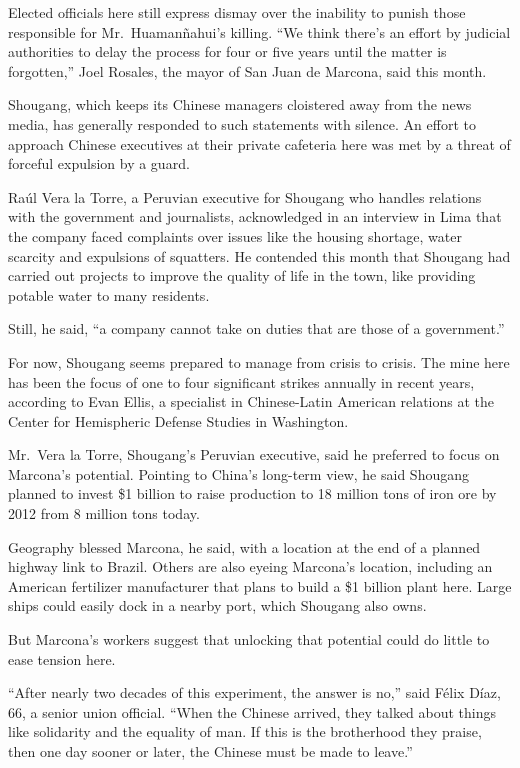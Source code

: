 ﻿\documentclass[12pt]{article}
\begin{document}
Elected officials here still express dismay over the inability to punish those responsible for
Mr.~Huaman\~{n}ahui's killing. ``We think there's an effort by judicial authorities to delay the
process for four or five years until the matter is forgotten,'' Joel Rosales, the mayor of San Juan
de Marcona, said this month.

Shougang, which keeps its Chinese managers cloistered away from the news media, has generally
responded to such statements with silence. An effort to approach Chinese executives at their private
cafeteria here was met by a threat of forceful expulsion by a guard.

Raúl Vera la Torre, a Peruvian executive for Shougang who handles relations with the government and
journalists, acknowledged in an interview in Lima that the company faced complaints over issues like
the housing shortage, water scarcity and expulsions of squatters. He contended this month that
Shougang had carried out projects to improve the quality of life in the town, like providing potable
water to many residents.

Still, he said, ``a company cannot take on duties that are those of a government.''

For now, Shougang seems prepared to manage from crisis to crisis. The mine here has been the focus
of one to four significant strikes annually in recent years, according to Evan Ellis, a specialist
in Chinese-Latin American relations at the Center for Hemispheric Defense Studies in Washington.

Mr.~Vera la Torre, Shougang's Peruvian executive, said he preferred to focus on Marcona's potential.
Pointing to China's long-term view, he said Shougang planned to invest \$1 billion to raise
production to 18 million tons of iron ore by 2012 from 8 million tons today.

Geography blessed Marcona, he said, with a location at the end of a planned highway link to Brazil.
Others are also eyeing Marcona's location, including an American fertilizer manufacturer that plans
to build a \$1 billion plant here. Large ships could easily dock in a nearby port, which Shougang
also owns.

But Marcona's workers suggest that unlocking that potential could do little to ease tension here.

``After nearly two decades of this experiment, the answer is no,'' said F\'elix Díaz, 66, a senior
union official. ``When the Chinese arrived, they talked about things like solidarity and the
equality of man. If this is the brotherhood they praise, then one day sooner or later, the Chinese
must be made to leave.''
\end{document}

